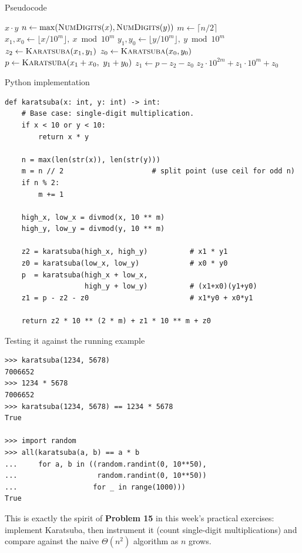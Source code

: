 \documentclass[11pt,aspectratio=169]{beamer}
\begin{document}
\begin{frame}{Pseudocode}
  \begin{algorithmic}[1]
       
        \State \Return $x \cdot y$
      \EndIf
      \State $n \gets \max(\textsc{NumDigits}(x), \textsc{NumDigits}(y))$
      \State $m \gets \lceil n/2 \rceil$
      \State $x_1, x_0 \gets \lfloor x / 10^m \rfloor,\ x \bmod 10^m$
      \State $y_1, y_0 \gets \lfloor y / 10^m \rfloor,\ y \bmod 10^m$
      \State $z_2 \gets \Call{Karatsuba}{x_1, y_1}$
      \State $z_0 \gets \Call{Karatsuba}{x_0, y_0}$
      \State $p \gets \Call{Karatsuba}{x_1+x_0,\ y_1+y_0}$
      \State $z_1 \gets p - z_2 - z_0$
      \State \Return $z_2 \cdot 10^{2m} + z_1 \cdot 10^{m} + z_0$
    \EndFunction
  \end{algorithmic}
\end{frame}

\begin{frame}[fragile]{Python implementation}
  \begin{lstlisting}[style=py]
def karatsuba(x: int, y: int) -> int:
    # Base case: single-digit multiplication.
    if x < 10 or y < 10:
        return x * y

    n = max(len(str(x)), len(str(y)))
    m = n // 2                     # split point (use ceil for odd n)
    if n % 2:
        m += 1

    high_x, low_x = divmod(x, 10 ** m)
    high_y, low_y = divmod(y, 10 ** m)

    z2 = karatsuba(high_x, high_y)          # x1 * y1
    z0 = karatsuba(low_x, low_y)            # x0 * y0
    p  = karatsuba(high_x + low_x,
                   high_y + low_y)          # (x1+x0)(y1+y0)
    z1 = p - z2 - z0                        # x1*y0 + x0*y1

    return z2 * 10 ** (2 * m) + z1 * 10 ** m + z0
  \end{lstlisting}
\end{frame}

\begin{frame}[fragile]{Testing it against the running example}
  \begin{lstlisting}[style=py]
>>> karatsuba(1234, 5678)
7006652
>>> 1234 * 5678
7006652
>>> karatsuba(1234, 5678) == 1234 * 5678
True

>>> import random
>>> all(karatsuba(a, b) == a * b
...     for a, b in ((random.randint(0, 10**50),
...                   random.randint(0, 10**50))
...                  for _ in range(1000)))
True
  \end{lstlisting}
  \vspace{0.5em}
  This is exactly the spirit of \textbf{Problem 15} in this week's practical exercises:
  implement Karatsuba, then instrument it (count single-digit multiplications) and compare
  against the naive $\Theta(n^2)$ algorithm as $n$ grows.
\end{frame}
\end{document}
